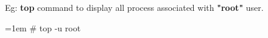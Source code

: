 \begin{flushleft}
\begin{itemize}
	Eg: \textbf{top} command to display all process associated with \textbf{"root"} user.
	\begin{tcolorbox}[breakable,notitle,boxrule=-0pt,colback=black,colframe=black]
		\color{green}
		\font=1em
		\#  top -u root
		\font=4pt
	\end{tcolorbox}
		
		
	\end{itemize}

\end{flushleft}

\newpage


